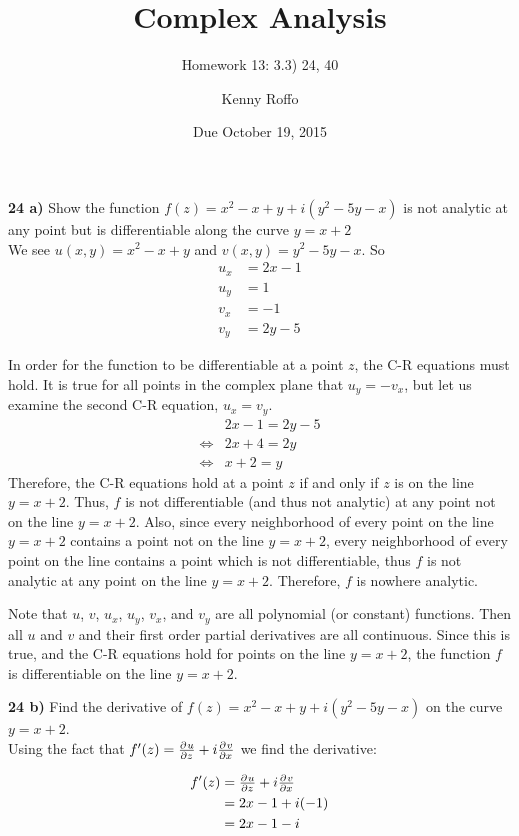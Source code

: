 \documentclass{scrartcl}
\title{Complex Analysis}
\subtitle{Homework 13: 3.3) 24, 40}
\author{Kenny Roffo}
\date{Due October 19, 2015}
\begin{document}
\maketitle

\textbf{24 a)} Show the function $f(z) = x^2 - x + y + i(y^2 - 5y - x)$ is not analytic at any point but is differentiable along the curve $y=x+2$\\

We see $u(x,y) = x^2 - x + y$ and $v(x,y) = y^2 - 5y - x$. So
\begin{align*}
  u_x &= 2x - 1\\
  u_y &= 1\\
  v_x &= -1\\
  v_y &= 2y - 5
\end{align*}

In order for the function to be differentiable at a point $z$, the C-R equations must hold. It is true for all points in the complex plane that $u_y = -v_x$, but let us examine the second C-R equation, $u_x = v_y$.
\begin{align*}
  &2x - 1 = 2y - 5\\
  \iff& 2x + 4 = 2y\\
  \iff& x + 2 = y
\end{align*}
Therefore, the C-R equations hold at a point $z$ if and only if $z$ is on the line $y = x + 2$. Thus, $f$ is not differentiable (and thus not analytic) at any point not on the line $y=x+2$. Also, since every neighborhood of every point on the line $y = x + 2$ contains a point not on the line $y=x+2$, every neighborhood of every point on the line contains a point which is not differentiable, thus $f$ is not analytic at any point on the line $y=x+2$. Therefore, $f$ is nowhere analytic.

Note that $u$, $v$, $u_x$, $u_y$, $v_x$, and $v_y$ are all polynomial (or constant) functions. Then all $u$ and $v$ and their first order partial derivatives are all continuous. Since this is true, and the C-R equations hold for points on the line $y=x+2$, the function $f$ is differentiable on the line $y=x+2$.
\pagebreak

\textbf{24 b)} Find the derivative of $f(z) = x^2 - x + y + i(y^2 - 5y - x)$ on the curve $y=x+2$.\\
Using the fact that $f'(z) = \pd{u}{z}+i\pd{v}{x}$ we find the derivative:

\begin{align*}
  f'(z) &= \pd{u}{z}+i\pd{v}{x}\\
  &= 2x-1 + i(-1)\\
  &= 2x - 1 - i
\end{align*}\\
\end{document}
